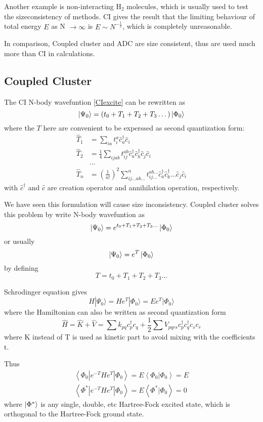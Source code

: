 Another example is non-interacting $\text{H}_2$ molecules, which is usually used to test the sizeconsistency of methods. \cite{h2problem}
CI gives the result that the limiting behaviour of total energy $E$ as N $\rightarrow \infty$ is $E \sim N^{-\frac{1}{2}}$, which is completely unreasonable.

In comparison, Coupled cluster and ADC are size consistent, thus are used much more than CI in calculations.

\subsection{Coupled Cluster}
The CI N-body wavefuntion \ref{CIexcite} can be rewritten as 
$$
\ket{\Psi_0}=(t_0+T_1+T_2+T_3 \dots)\ket{\Phi_0}
$$
where the $T$ here are convenient to be experssed as second quantization form:
$$
\begin{aligned}
	\hat{T}_{1} &=\sum_{i a} t_{i}^{a} \hat{c}_{a}^{\dagger} \hat{c}_{i}
	\\
	\hat{T}_{2} &=\frac{1}{4} \sum_{i j a b} t_{i j}^{a b} \hat{c}_{a}^{\dagger} \hat{c}_{b}^{\dagger} \hat{c}_{j} \hat{c}_{i}
	\\
	&\dots
	\\
	\hat{T}_{n}&=\left(\frac{1}{n !}\right)^{2} \sum_{i j \ldots a b \ldots}^{n} t_{i j \ldots}^{a b \ldots} \hat{c}_{a}^{\dagger} \hat{c}_{b}^{\dagger} \ldots \hat{c}_{j} \hat{c}_{i}
\end{aligned}
$$
with $\hat{c}^{\dagger}$ and $\hat{c}$ are creation operator and annihilation operation, respectively.

We have seen this formulation will cause size inconsistency.
Coupled cluster solves this problem by write N-body wavefuntion as
$$
\ket{\Psi_0}=e^{t_0+T_1+T_2+T_3 \dots}\ket{\Phi_0}
$$
or usually
$$
\ket{\Psi_0}=e^{T}\ket{\Phi_0}
$$
by defining
$$
T=t_0+T_1+T_2+T_3 \dots
$$

Schrodinger equation gives
$$
H | \Psi_{0} \rangle=H e^{T} | \Phi_{0} \rangle=E e^{T} | \Phi_{0} \rangle
$$
where the Hamiltonian can also be written as second quantization form
$$
\hat{H}=\hat{K}+\hat{V}=\sum k_{p q} c_{p}^{\dagger} c_{q}+\frac{1}{2} \sum V_{p q r s} c_{p}^{\dagger} c_{q}^{\dagger} c_{s} c_{r}
$$
where K instead of T is used as kinetic part to avoid mixing with the coefficients t.

Thus
$$
\begin{array}{l}
{\left\langle\Phi_{0}\left|e^{-T} H e^{T}\right| \Phi_{0}\right\rangle= E\left\langle\Phi_{0} | \Phi_{0}\right\rangle= E}
\\
{\left\langle\Phi^{*}\left|e^{-T} H e^{T}\right| \Phi_{0}\right\rangle= E\left\langle\Phi^{*} | \Phi_{0}\right\rangle= 0}
\end{array}
$$
where $\ket{\Phi^{*}}$ is any single, double, etc Hartree-Fock excited state, which is orthogonal to the Hartree-Fock ground state.


